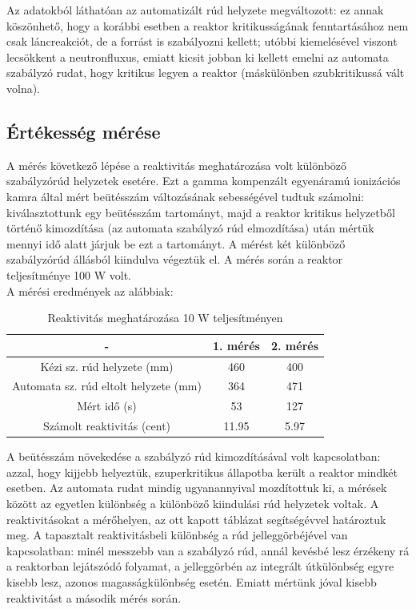 \documentclass[12pt,a4paper]{article}
\begin{document}
\hspace*{10pt} Az adatokból láthatóan az automatizált rúd helyzete megváltozott: ez annak köszönhető, hogy a korábbi esetben a reaktor kritikusságának fenntartásához nem csak láncreakciót, de a forrást is szabályozni kellett; utóbbi kiemelésével viszont lecsökkent a neutronfluxus, emiatt kicsit jobban ki kellett emelni az automata szabályzó rudat, hogy kritikus legyen a reaktor (máskülönben szubkritikussá vált volna). \\
\newpage
\subsection{Értékesség mérése}
\hspace*{10pt} A mérés következő lépése a reaktivitás meghatározása volt különböző szabályzórúd helyzetek esetére. Ezt a gamma kompenzált egyenáramú ionizációs kamra által mért beütésszám változásának sebességével tudtuk számolni: kiválasztottunk egy beütésszám tartományt, majd a reaktor kritikus helyzetből történő kimozdítása (az automata szabályzó rúd elmozdítása) után mértük mennyi idő alatt járjuk be ezt a tartományt. A mérést két különböző szabályzórúd állásból kiindulva végeztük el. A mérés során a reaktor teljesítménye 100 W volt.\\
A mérési eredmények az alábbiak:
\begin{table}[!h]
\begin{center}
\begin{tabular}{|c|c|c|}
\hline
- & 1. mérés & 2. mérés\\
\hline
Kézi sz. rúd helyzete (mm) & 460 & 400\\
\hline
Automata sz. rúd eltolt helyzete (mm) & 364 & 471 \\
\hline
Mért idő (s) & 53 & 127  \\
\hline
Számolt reaktivitás (cent) & 11.95 & 5.97 \\
\hline
\end{tabular}
\caption{Reaktivitás meghatározása 10 W teljesítményen}
\end{center}
\end{table} 
\newline
\hspace*{10pt} A beütésszám növekedése a szabályzó rúd kimozdításával volt kapcsolatban: azzal, hogy kijjebb helyeztük, szuperkritikus állapotba került a reaktor mindkét esetben. Az automata rudat mindig ugyanannyival mozdítottuk ki, a mérések között az egyetlen különbség a különböző kiindulási rúd helyzetek voltak. A reaktivitásokat a mérőhelyen, az ott kapott táblázat segítségévvel határoztuk meg. A tapasztalt reaktivitásbeli különbség a rúd jelleggörbéjével van kapcsolatban: minél messzebb van a szabályzó rúd, annál kevésbé lesz érzékeny rá a reaktorban lejátszódó folyamat, a jelleggörbén az integrált útkülönbség egyre kisebb lesz, azonos magasságkülönbség esetén. Emiatt mértünk jóval kisebb reaktivitást a második mérés során.\\
\newpage
\end{document}
